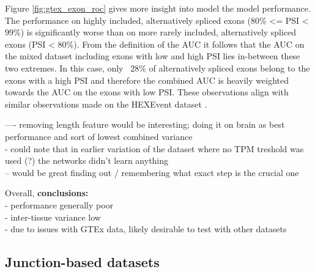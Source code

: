 Figure \ref{fig:gtex_exon_roc} gives more insight into model the model performance. The performance on highly included, alternatively spliced exons (80\% <= PSI < 99\%) is significantly worse than on more rarely included, alternatively spliced exons (PSI < 80\%). From the definition of the AUC it follows that the AUC on the mixed dataset including exons with low and high PSI lies in-between these two extremes. In this case, only ~28\% of alternatively spliced exons belong to the exons with a high PSI and therefore the combined AUC is heavily weighted towards the AUC on the exons with low PSI. These observations align with similar observations made on the HEXEvent dataset \cite{dsc}.

---- removing length feature would be interesting; doing it on brain as best performance and sort of lowest combined variance\\




%

- could note that in earlier variation of the dataset where no TPM treshold was used (?) the networks didn't learn anything\\
	-- would be great finding out / remembering what exact step is the crucial one
	


Overall, 
\textbf{conclusions:}\\
	- performance generally poor\\
	- inter-tissue variance low\\
	- due to issues with GTEx data, likely desirable to test with other datasets
	
	
	

\subsection{Junction-based datasets} \label{subsec:gtex_junc}

